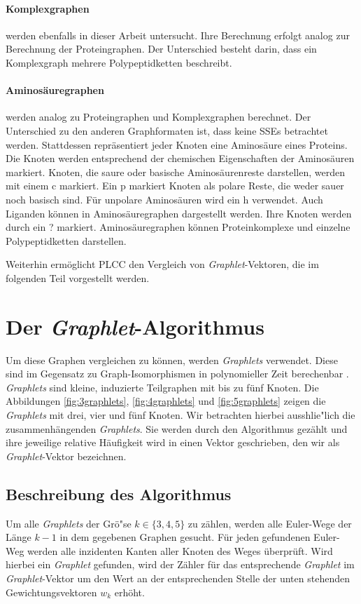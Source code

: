 \documentclass{report}
\begin{document}
\paragraph{Komplexgraphen}

werden ebenfalls in dieser Arbeit untersucht. Ihre Berechnung erfolgt analog zur Berechnung der Proteingraphen. Der Unterschied besteht darin, dass ein Komplexgraph mehrere Polypeptidketten beschreibt.

\paragraph{Aminos\"auregraphen} werden analog zu Proteingraphen und Komplexgraphen berechnet. Der Unterschied zu den anderen Graphformaten ist, dass keine SSEs betrachtet werden. Stattdessen repr\"asentiert jeder Knoten eine Aminos\"aure eines Proteins. Die Knoten werden entsprechend der chemischen Eigenschaften der Aminos\"auren markiert. Knoten, die saure oder basische Aminos\"aurenreste darstellen, werden mit einem c markiert. Ein p markiert Knoten als polare Reste, die weder sauer noch basisch sind. F\"ur unpolare Aminos\"auren wird ein h verwendet. Auch Liganden k\"onnen in Aminos\"auregraphen dargestellt werden. Ihre Knoten werden durch ein ? markiert. Aminos\"auregraphen k\"onnen Proteinkomplexe und einzelne Polypeptidketten darstellen.


Weiterhin erm\"oglicht PLCC den Vergleich von \textit{Graphlet}-Vektoren, die im folgenden Teil vorgestellt werden.


\section{Der \textit{Graphlet}-Algorithmus}


Um diese Graphen vergleichen zu k\"onnen, werden \textit{Graphlets} verwendet. Diese sind im Gegensatz zu Graph-Isomorphismen in polynomieller Zeit berechenbar \cite{sherv_graphlets}. \textit{Graphlets} sind kleine, induzierte Teilgraphen mit bis zu f\"unf Knoten. Die Abbildungen \ref{fig:3graphlets}, \ref{fig:4graphlets} und \ref{fig:5graphlets} zeigen die \textit{Graphlets} mit drei, vier und f\"unf Knoten. Wir betrachten hierbei ausshlie"lich die zusammenh\"angenden \textit{Graphlets}. Sie werden durch den Algorithmus gez\"ahlt und ihre jeweilige relative H\"aufigkeit wird in einen Vektor geschrieben, den wir als \textit{Graphlet}-Vektor bezeichnen.


\subsection{Beschreibung des Algorithmus}
Um alle \textit{Graphlets} der Gr\"o"se $k \in \{3,4,5\}$ zu z\"ahlen, werden alle Euler-Wege der L\"ange $k-1$ in dem gegebenen Graphen gesucht. F\"ur jeden gefundenen Euler-Weg werden alle inzidenten Kanten aller Knoten des Weges \"uberpr\"uft. Wird hierbei ein \textit{Graphlet} gefunden, wird der Z\"ahler f\"ur das entsprechende \textit{Graphlet} im \textit{Graphlet}-Vektor um den Wert an der entsprechenden Stelle der unten stehenden Gewichtungsvektoren $w_k$ erh\"oht.
\end{document}
